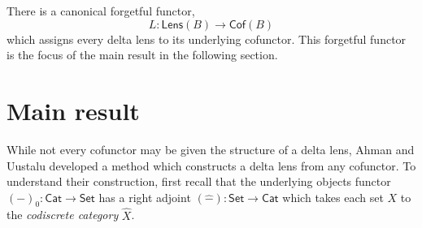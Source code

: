 \documentclass[colorlinks = true, a4paper, oneside, reqno, 11pt]{amsart}
\theoremstyle{definition}
\theoremstyle{remark}
\newcommand{\Set}{\mathsf{Set}}
\newcommand{\Cat}{\mathsf{Cat}}
\newcommand{\Cof}{\mathsf{Cof}}
\newcommand{\Lens}{\mathsf{Lens}}
\begin{document}
There is a canonical forgetful functor,
\begin{equation*}
	L \colon \Lens(B) \longrightarrow \Cof(B)
\end{equation*}
which assigns every delta lens to its underlying cofunctor. 
This forgetful functor is the focus of the main result in the following section. 

\section{Main result}
\label{sec:main-result}

While not every cofunctor may be given the structure of a delta lens, 
Ahman and Uustalu \cite{AU16} developed a method which constructs a 
delta lens from any cofunctor.
To understand their construction, first recall that the underlying objects functor 
$(-)_{0} \colon \Cat \rightarrow \Set$ has a right adjoint 
$(\widehat{-}) \colon \Set \rightarrow \Cat$ which takes each set $X$ 
to the \emph{codiscrete category} $\widehat{X}$.
\end{document}

